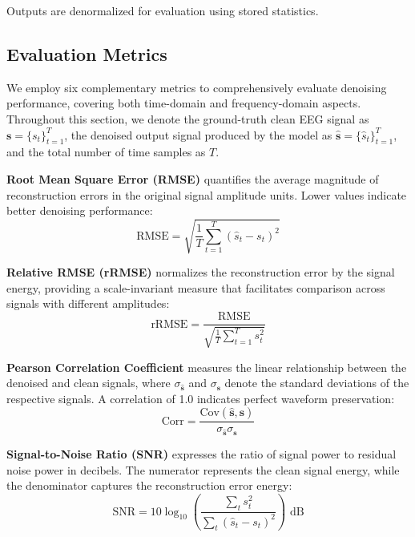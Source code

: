 \documentclass{article}
\begin{document}
Outputs are denormalized for evaluation using stored statistics.

\subsection{Evaluation Metrics}

We employ six complementary metrics to comprehensively evaluate denoising performance, covering both time-domain and frequency-domain aspects. Throughout this section, we denote the ground-truth clean EEG signal as $\mathbf{s} = \{s_t\}_{t=1}^{T}$, the denoised output signal produced by the model as $\hat{\mathbf{s}} = \{\hat{s}_t\}_{t=1}^{T}$, and the total number of time samples as $T$.

\textbf{Root Mean Square Error (RMSE)} quantifies the average magnitude of reconstruction errors in the original signal amplitude units. Lower values indicate better denoising performance:
\begin{equation}
\text{RMSE} = \sqrt{\frac{1}{T}\sum_{t=1}^{T}(\hat{s}_t - s_t)^2}
\end{equation}

\textbf{Relative RMSE (rRMSE)} normalizes the reconstruction error by the signal energy, providing a scale-invariant measure that facilitates comparison across signals with different amplitudes:
\begin{equation}
\text{rRMSE} = \frac{\text{RMSE}}{\sqrt{\frac{1}{T}\sum_{t=1}^{T}s_t^2}}
\end{equation}

\textbf{Pearson Correlation Coefficient} measures the linear relationship between the denoised and clean signals, where $\sigma_{\hat{\mathbf{s}}}$ and $\sigma_{\mathbf{s}}$ denote the standard deviations of the respective signals. A correlation of 1.0 indicates perfect waveform preservation:
\begin{equation}
\text{Corr} = \frac{\text{Cov}(\hat{\mathbf{s}}, \mathbf{s})}{\sigma_{\hat{\mathbf{s}}} \sigma_{\mathbf{s}}}
\end{equation}

\textbf{Signal-to-Noise Ratio (SNR)} expresses the ratio of signal power to residual noise power in decibels. The numerator represents the clean signal energy, while the denominator captures the reconstruction error energy:
\begin{equation}
\text{SNR} = 10 \log_{10}\left(\frac{\sum_t s_t^2}{\sum_t (\hat{s}_t - s_t)^2}\right) \text{ dB}
\end{equation}
\end{document}
